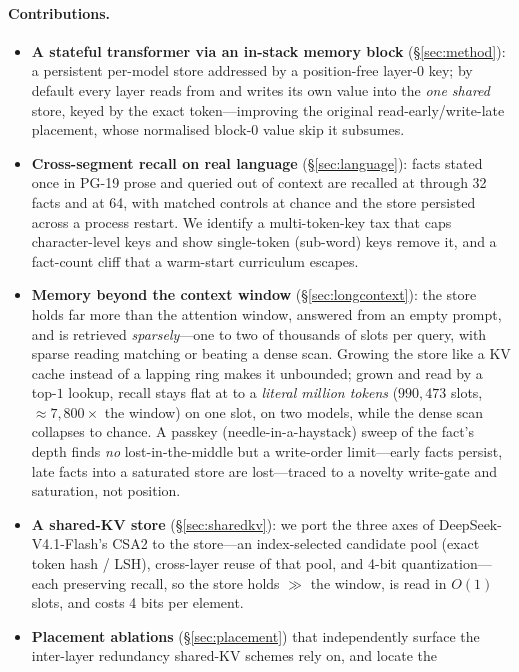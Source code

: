 \paragraph{Contributions.}
\begin{itemize}
\item \textbf{A stateful transformer via an in-stack memory block} (\S\ref{sec:method}):
a persistent per-model store addressed by a position-free layer-0 key; by default
every layer reads from and writes its own value into the \emph{one shared} store,
keyed by the exact token---improving the original read-early/write-late placement,
whose normalised block-0 value skip it subsumes.
\item \textbf{Cross-segment recall on real language} (\S\ref{sec:language}):
facts stated once in PG-19 prose and queried out of context are recalled at
 through 32 facts and  at 64, with matched controls at
chance and the store persisted across a process restart. We identify a
multi-token-key tax that caps character-level keys and show single-token
(sub-word) keys remove it, and a fact-count cliff that a warm-start curriculum
escapes.
\item \textbf{Memory beyond the context window} (\S\ref{sec:longcontext}): the
store holds far more than the attention window, answered from an empty prompt,
and is retrieved \emph{sparsely}---one to two of thousands of slots per query,
with sparse reading matching or beating a dense scan. Growing the store like a
KV cache instead of a lapping ring makes it unbounded; grown and read by a
top-$1$ lookup, recall stays flat at  to a \emph{literal million
tokens} ($990{,}473$ slots, $\approx\!7{,}800\times$ the window) on one slot, on two
models, while the dense scan collapses to chance. A passkey (needle-in-a-haystack)
sweep of the fact's depth finds \emph{no} lost-in-the-middle but a write-order
limit---early facts persist, late facts into a saturated store are lost---traced to
a novelty write-gate and saturation, not position.
\item \textbf{A shared-KV store} (\S\ref{sec:sharedkv}): we port the three axes of
DeepSeek-V4.1-Flash's CSA2 to the store---an index-selected candidate pool
(exact token hash / LSH), cross-layer reuse of that pool, and 4-bit
quantization---each preserving recall, so the store holds $\gg$ the window, is
read in $O(1)$ slots, and costs 4 bits per element.
\item \textbf{Placement ablations} (\S\ref{sec:placement}) that independently
surface the inter-layer redundancy shared-KV schemes rely on, and locate the

\end{itemize}
